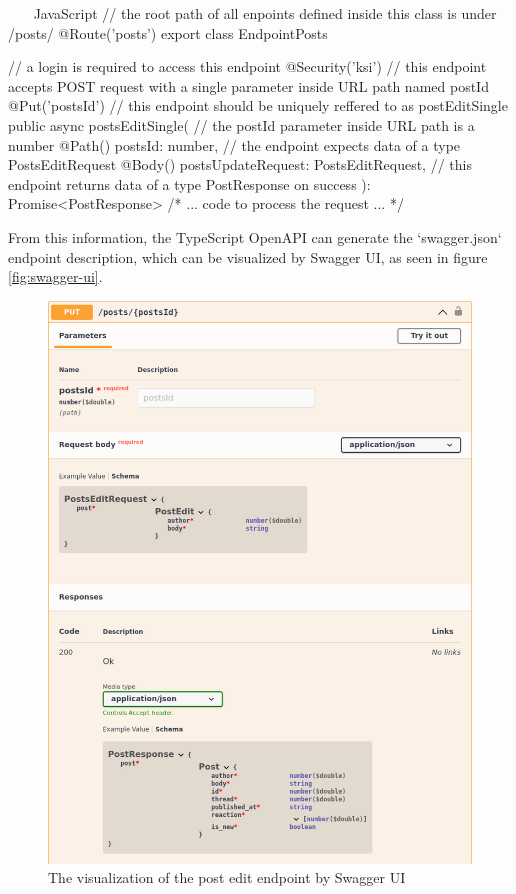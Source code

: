 \documentclass[
  digital, %
  oneside, %
  lof,     %
  nolot,     %
]{fithesis4}
\begin{document}
~~~ JavaScript
// the root path of all enpoints defined inside this class is under /posts/
@Route('posts')
export class EndpointPosts {
// a login is required to access this endpoint
    @Security('ksi')
// this endpoint accepts POST request with a single parameter inside URL path named postId
    @Put('{postsId}')
// this endpoint should be uniquely reffered to as postEditSingle
    public async postsEditSingle(
// the postId parameter inside URL path is a number
        @Path() postsId: number,
// the endpoint expects data of a type PostsEditRequest 
        @Body() postsUpdateRequest: PostsEditRequest,
// this endpoint returns data of a type PostResponse on success
    ): Promise<PostResponse>
    {  /* ... code to process the request ... */  }
~~~

From this information, the TypeScript OpenAPI can generate the `swagger.json` endpoint description, which can be visualized by Swagger UI, as seen in figure \autoref{fig:swagger-ui}.

\begin{figure}
\includegraphics[width=\textwidth]{assets/img/swagger-ui}
\caption{The visualization of the post edit endpoint by Swagger UI}
\label{fig:swagger-ui}
\end{figure}

}
\end{document}
